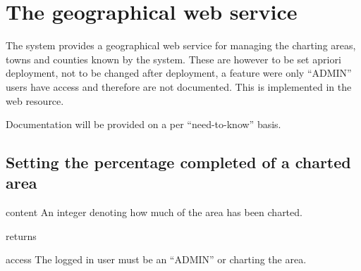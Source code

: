 \section{The geographical web service}

The system provides a geographical web service for managing the charting areas,
towns and counties known by the system. These are however to be set apriori
deployment, not to be changed after deployment, a feature were only ``ADMIN''
users have access and therefore are not documented. This is implemented in the
 web resource.

Documentation will be provided on a per ``need-to-know'' basis.

\subsection{Setting the percentage completed of a charted area}

\begin{apidata}{content}
  An integer denoting how much of the area has been charted.
\end{apidata}
\begin{apidata}{returns}
  \begin{datalist}
  \end{datalist}
\end{apidata}
\begin{apidata}{access}
The logged in user must be an ``ADMIN'' or charting the area.
\end{apidata}


